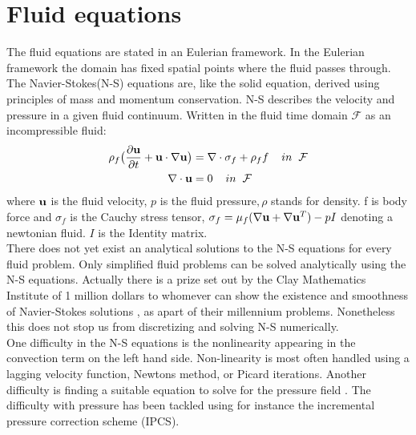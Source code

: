 
\section{Fluid equations}
The fluid equations are stated in an Eulerian framework. In the Eulerian framework the domain has fixed spatial points where the fluid passes through. 
The Navier-Stokes(N-S) equations are, like the solid equation, derived using principles of mass and momentum conservation. N-S describes the velocity and pressure in a given fluid continuum. Written in the fluid time domain $\mathcal{F}$ as an incompressible fluid:
\begin{align}
\label{eq:NS}
\rho_f\big( \frac{\partial \bold{u}}{\partial t} +  \bold{u} \cdot \nabla \bold{u}\big) &= \nabla \cdot \sigma_f + \rho_ff  \hspace{4mm} in \hspace{2mm} \mathcal{F}\\
\nabla \cdot \bold{u} &= 0 \hspace{4mm} in \hspace{2mm} \mathcal{F}
\end{align}
where $\bold{u}$ is the fluid velocity, $p$ is the fluid pressure$, \rho$ stands for density. f is body force and $\sigma_f$ is the Cauchy stress tensor, $ \sigma_f = \mu_f (\nabla \bold{u} + \nabla \bold{u}^T)  - pI$ denoting a newtonian fluid. $I$ is the Identity matrix. \\

There does not yet exist an analytical solutions to the N-S equations for every fluid problem. Only simplified fluid problems can be solved \cite{White2000} analytically using the N-S equations. Actually there is a prize set out by the Clay Mathematics Institute of 1 million dollars to whomever can show the existence and smoothness of Navier-Stokes solutions \cite{Fefferman2000}, as apart of their millennium problems. 
Nonetheless this does not stop us from discretizing and solving N-S numerically. \\

One difficulty in the N-S equations is the nonlinearity appearing in the convection term on the left hand side. Non-linearity is most often handled using a lagging velocity function, Newtons method, or Picard iterations. Another difficulty is finding a suitable equation to solve for the pressure field \cite{Charlesworth2003}. The difficulty with pressure has been tackled using for instance the incremental pressure correction scheme (IPCS).